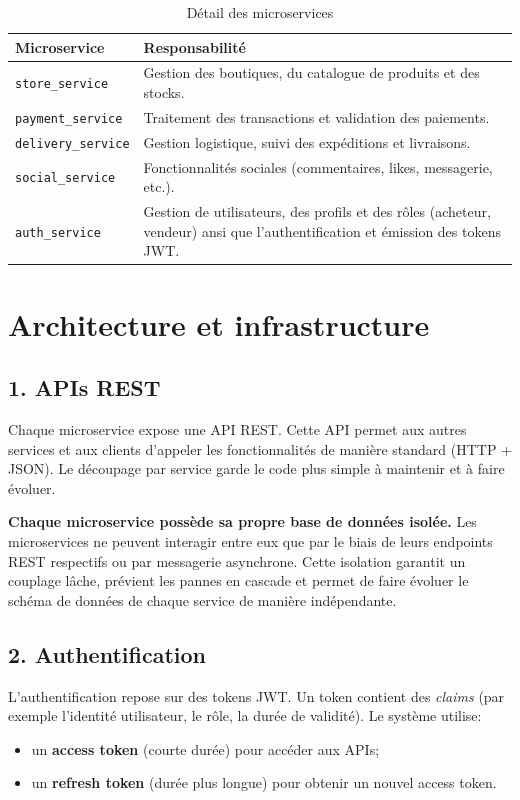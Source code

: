\documentclass[11pt,a4paper]{article}
\begin{document}
\begin{table}[h]
\centering
\begin{tabular}{|l|p{10cm}|}
\hline
\textbf{Microservice} & \textbf{Responsabilité} \\ \hline
\texttt{store\_service} & Gestion des boutiques, du catalogue de produits et des stocks. \\ \hline
\texttt{payment\_service} & Traitement des transactions et validation des paiements. \\ \hline
\texttt{delivery\_service} & Gestion logistique, suivi des expéditions et livraisons. \\ \hline
\texttt{social\_service} & Fonctionnalités sociales (commentaires, likes, messagerie, etc.). \\ \hline
\texttt{auth\_service} & Gestion de utilisateurs, des profils et des rôles (acheteur, vendeur) ansi que l'authentification et émission des tokens JWT. \\ \hline
\end{tabular}
\caption{Détail des microservices}
\label{tab:microservices}
\end{table}

\section{Architecture et infrastructure}

\subsection{1. APIs REST}
Chaque microservice expose une API REST.
Cette API permet aux autres services et aux clients d'appeler les fonctionnalit\'es de mani\`ere standard (HTTP + JSON).
Le d\'ecoupage par service garde le code plus simple \`a maintenir et \`a faire \'evoluer.

\textbf{Chaque microservice possède sa propre base de données isolée.} Les microservices ne peuvent interagir entre eux que par le biais de leurs endpoints REST respectifs ou par messagerie asynchrone. Cette isolation garantit un couplage lâche, prévient les pannes en cascade et permet de faire évoluer le schéma de données de chaque service de manière indépendante.
\subsection{2. Authentification}
L'authentification repose sur des tokens JWT.
Un token contient des \textit{claims} (par exemple l'identit\'e utilisateur, le r\^ole, la dur\'ee de validit\'e).
Le syst\`eme utilise:
\begin{itemize}
  \item un \textbf{access token} (courte dur\'ee) pour acc\'eder aux APIs;
  \item un \textbf{refresh token} (dur\'ee plus longue) pour obtenir un nouvel access token.
\end{itemize}
\end{document}
